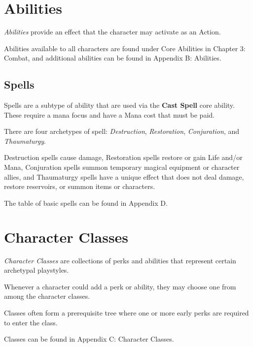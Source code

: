 \newpage


\section{Abilities}

\textit{Abilities} provide an effect that the character may activate as an Action.

\vspace{0.4em}

Abilities available to all characters are found under Core Abilities in Chapter 3: Combat,
and additional abilities can be found in Appendix B: Abilities.


\subsection{Spells}
Spells are a subtype of ability that are used via the \textbf{Cast Spell} core ability.
These require a mana focus and have a Mana cost that must be paid.

\vspace{0.4em}

There are four archetypes of spell: 
\textit{Destruction}, \textit{Restoration}, \textit{Conjuration}, and \textit{Thaumaturgy}.

\vspace{0.4em}

Destruction spells cause damage, Restoration spells restore or gain Life and/or Mana,
Conjuration spells summon temporary magical equipment or character allies,
and Thaumaturgy spells have a unique effect that does not deal damage, restore reservoirs, 
or summon items or characters.

\vspace{0.4em}

The table of basic spells can be found in Appendix D.




\section{Character Classes}
\textit{Character Classes} are collections of perks and abilities that represent certain 
archetypal playstyles.

\vspace{0.4em}

Whenever a character could add a perk or ability, they may choose one from among the character classes. 

\vspace{0.4em}

Classes often form a prerequisite tree where one or more early perks are required to enter the class.

\vspace{0.4em}

Classes can be found in Appendix C: Character Classes.


